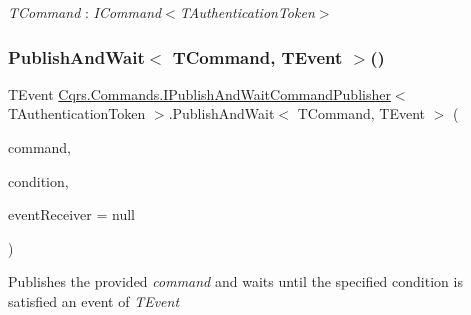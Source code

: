 \begin{Desc}
\item[Type Constraints]\begin{description}
\item[{\em T\+Command} : {\em I\+Command$<$T\+Authentication\+Token$>$}]\end{description}
\end{Desc}
\mbox{\label{interfaceCqrs_1_1Commands_1_1IPublishAndWaitCommandPublisher_a83e4480bf8cd6015254d700056cf1647_a83e4480bf8cd6015254d700056cf1647}} 
\subsubsection{\texorpdfstring{Publish\+And\+Wait$<$ T\+Command, T\+Event $>$()}{PublishAndWait< TCommand, TEvent >()}\hspace{0.1cm}{\footnotesize\ttfamily [4/6]}}
{\footnotesize\ttfamily T\+Event \hyperlink{interfaceCqrs_1_1Commands_1_1IPublishAndWaitCommandPublisher}{Cqrs.\+Commands.\+I\+Publish\+And\+Wait\+Command\+Publisher}$<$ T\+Authentication\+Token $>$.Publish\+And\+Wait$<$ T\+Command, T\+Event $>$ (\begin{DoxyParamCaption}\item[{T\+Command}]{command,  }\item[{Func$<$ I\+Enumerable$<$ \hyperlink{interfaceCqrs_1_1Events_1_1IEvent}{I\+Event}$<$ T\+Authentication\+Token $>$$>$, T\+Event $>$}]{condition,  }\item[{\hyperlink{interfaceCqrs_1_1Events_1_1IEventReceiver}{I\+Event\+Receiver}$<$ T\+Authentication\+Token $>$}]{event\+Receiver = {\ttfamily null} }\end{DoxyParamCaption})}



Publishes the provided {\itshape command}  and waits until the specified condition is satisfied an event of {\itshape T\+Event}  


